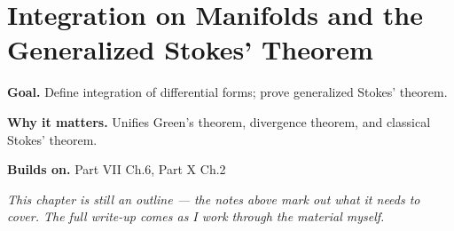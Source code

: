 \chapter{Integration on Manifolds and the Generalized Stokes' Theorem}
\label{ch:10-differential-geometry-03}

\begin{chapterintro}
\textbf{Goal.} Define integration of differential forms; prove generalized Stokes' theorem.

\textbf{Why it matters.} Unifies Green's theorem, divergence theorem, and classical Stokes' theorem.

\textbf{Builds on.} Part VII Ch.6, Part X Ch.2
\end{chapterintro}

\textit{This chapter is still an outline --- the notes above mark out what it needs to cover. The full write-up comes as I work through the material myself.}
